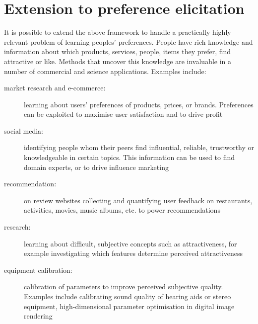 \section{Extension to preference elicitation}

It is possible to extend the above framework to handle a practically highly relevant problem of learning peoples' preferences. People have rich knowledge and information about which products, services, people, items they prefer, find attractive or like. Methods that uncover this knowledge are invaluable in a number of commercial and science applications. Examples include:
\begin{description}
	\item [market research and e-commerce:] learning about users' preferences of products, prices, or brands. Preferences can be exploited to maximise user satisfaction and to drive profit
	\item [social media:] identifying people whom their peers find influential, reliable, trustworthy or knowledgeable in certain topics. This information can be used to find domain experts, or to drive influence marketing
	\item [recommendation:] on review websites collecting and quantifying user feedback on restaurants, activities, movies, music albums, etc. to power recommendations
	\item [research:] learning about difficult, subjective concepts such as attractiveness, for example investigating which features determine perceived attractiveness
	\item [equipment calibration:] calibration of parameters to improve perceived subjective quality. Examples include calibrating sound quality of hearing aids or stereo equipment, high-dimensional parameter optimisation in digital image rendering
\end{description}

